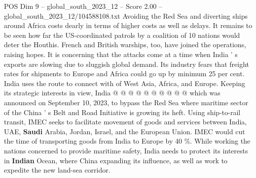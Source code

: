 \begin{textsample}{POS Dim 9 – global\_south\_2023\_12 – Score 2.00 – global\_south\_2023\_12/104588108.txt}
Avoiding the Red Sea and diverting ships around Africa costs dearly in terms of higher costs as well as delays.
It remains to be seen how far the US-coordinated patrols by a coalition of 10 nations would deter the Houthis.
French and British warships, too, have joined the operations, raising hopes.
It is concerning that the attacks come at a time when India ' s exports are slowing due to sluggish global demand.
Its industry fears that freight rates for shipments to Europe and Africa could go up by minimum 25 per cent.
India uses the route to connect with of West Asia, Africa, and Europe.
Keeping its strategic interests in view, India @ @ @ @ @ @ @ @ @ @ which was announced on September 10, 2023, to bypass the Red Sea where maritime sector of the China ' s Belt and Road Initiative is growing its heft.
Using ship-to-rail transit, IMEC seeks to facilitate movement of goods and services between India, UAE, \textbf{Saudi} Arabia, Jordan, Israel, and the European Union.
IMEC would cut the time of transporting goods from India to Europe by 40 \%.
While working the nations concerned to provide maritime safety, India needs to protect its interests in \textbf{Indian} Ocean, where China expanding its influence, as well as work to expedite the new land-sea corridor.

\end{textsample}
